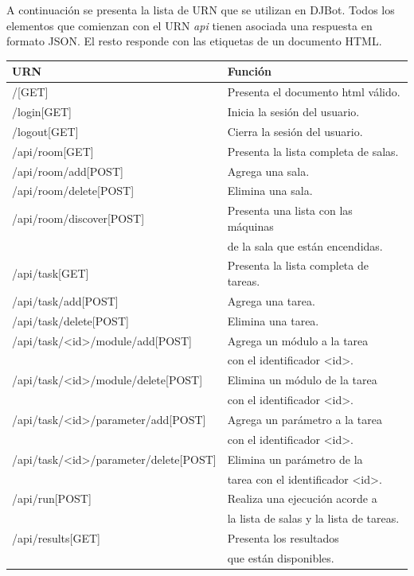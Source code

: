 \documentclass[a4paper,12pt]{article}
\begin{document}
A continuación se presenta la lista de URN que se utilizan en DJBot. Todos los elementos que comienzan con el URN \emph{api} tienen asociada una respuesta en formato JSON. El resto responde con las etiquetas de un documento HTML.\\

{\fontsize{10}{12}\selectfont

\begin{center}
\begin{tabulary}{\textwidth}{l|L}
URN & Función\\
\hline
/[GET] & Presenta el documento html válido.\\
/login[GET] & Inicia la sesión del usuario.\\
/logout[GET] & Cierra la sesión del usuario.\\
/api/room[GET] & Presenta la lista completa de salas.\\
/api/room/add[POST] & Agrega una sala.\\
/api/room/delete[POST] & Elimina una sala.\\
/api/room/discover[POST] & Presenta una lista con las máquinas\\
 & de la sala que están encendidas.\\
/api/task[GET] & Presenta la lista completa de tareas.\\
/api/task/add[POST] & Agrega una tarea.\\
/api/task/delete[POST] & Elimina una tarea.\\
/api/task/<id>/module/add[POST] & Agrega un módulo a la tarea\\
 & con el identificador <id>.\\
/api/task/<id>/module/delete[POST] & Elimina un módulo de la tarea\\
 & con el identificador <id>.\\
/api/task/<id>/parameter/add[POST] & Agrega un parámetro a la tarea\\
 & con el identificador <id>.\\
/api/task/<id>/parameter/delete[POST] & Elimina un parámetro de la\\
 & tarea con el identificador <id>.\\
/api/run[POST] & Realiza una ejecución acorde a\\
 & la lista de salas y la lista de tareas.\\
/api/results[GET] & Presenta los resultados\\
 & que están disponibles.\\

\end{tabulary}
\end{center}}
\end{document}
